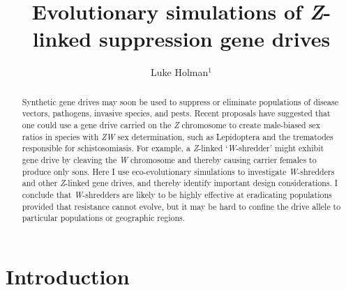 \documentclass[]{rsos}%
\begin{document}
\title{Evolutionary simulations of \emph{Z}-linked suppression gene drives}

\author{
Luke Holman$^{1}$}

\address{
  $^{1}$School of BioSciences, The University of Melbourne, Victoria 3010,
Australia.}
\subject{
Evolutionary biology,
Theoretical modelling,
Gene drives}



\begin{abstract}
Synthetic gene drives may soon be used to suppress or eliminate
populations of disease vectors, pathogens, invasive species, and pests.
Recent proposals have suggested that one could use a gene drive carried
on the \emph{Z} chromosome to create male-biased sex ratios in species
with \emph{ZW} sex determination, such as Lepidoptera and the trematodes
responsible for schistosomiasis. For example, a \emph{Z}-linked
`\emph{W}-shredder' might exhibit gene drive by cleaving the \emph{W}
chromosome and thereby causing carrier females to produce only sons.
Here I use eco-evolutionary simulations to investigate
\emph{W}-shredders and other \emph{Z}-linked gene drives, and thereby
identify important design considerations. I conclude that
\emph{W}-shredders are likely to be highly effective at eradicating
populations provided that resistance cannot evolve, but it may be hard
to confine the drive allele to particular populations or geographic
regions.
\end{abstract}

\providecommand{\tightlist}{%
  \setlength{\itemsep}{0pt}\setlength{\parskip}{0pt}}
\providecommand{\EndFirstPage}{%
}

\maketitle

\hypertarget{introduction}{%
\section{Introduction}\label{introduction}}
\end{document}
